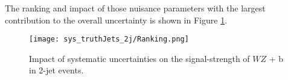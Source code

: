 The ranking and impact of those nuisance parameters with the largest contribution to the overall uncertainty is shown in Figure \ref{fig:ranking_2j}.

\begin{figure}[H]
    \centering
    \texttt{[image: sys\_truthJets\_2j/Ranking.png]}
    \caption{Impact of systematic uncertainties on the signal-strength of $WZ$ + b in 2-jet events.}
    \label{fig:ranking_2j}
\end{figure}




